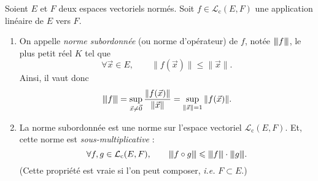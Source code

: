 \begin{prop-defn}
	Soient $E$ et $F$ deux espaces vectoriels normés. Soit $f \in \mathcal{L}_\mathrm{c}(E, F)$\/ une application linéaire de $E$ vers $F$.
	\begin{enumerate}
		\item On appelle \textit{norme subordonnée} (ou norme d'opérateur) de $f$, notée $\sub f$, le plus petit réel $K$ tel que \[
				\forall \vec{x} \in E, \quad\quad \|f(\vec{x})\| \le \|\vec{x}\|
			.\] Ainsi, il vaut donc \[
				\sub f = \sup_{\vec{x} \neq \vec{0}} \frac{\|f(\vec{x})\|}{\|\vec{x}\|} = \sup_{\|\vec{x}\| = 1} \|f(\vec{x})\|
			.\]
		\item La norme subordonnée est une norme sur l'espace vectoriel $\mathcal{L}_\mathrm{c}(E, F)$. Et, cette norme est \textit{sous-multiplicative} : \[
				\forall f, g \in \mathcal{L}_\mathrm{c}(E, F), \quad\quad \sub {f \circ g} \le \sub f \cdot \sub g
			.\] (Cette propriété est vraie si l'on peut composer, \textit{i.e.} $F \subset E$.)
	\end{enumerate}
\end{prop-defn}

